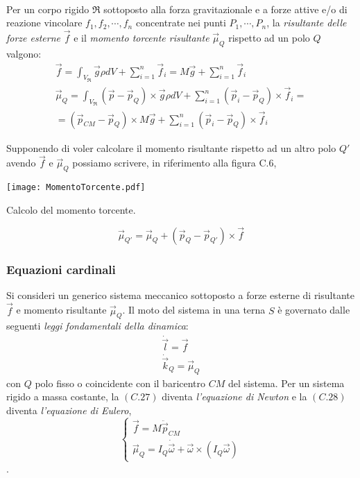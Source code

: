 \paragraph{}
Per un corpo rigido $\mathfrak{R}$ sottoposto alla forza gravitazionale e a forze attive e/o di reazione vincolare $f_1, f_2, \cdots, f_n$ concentrate nei punti $P_1, \cdots, P_n$, la \emph{risultante delle forze esterne} $\vec{f}$ e il \emph{momento torcente risultante} $\vec{\mu}_Q$ rispetto ad un polo $Q$ valgono:
\begin{eqnarray}
	\vec{f} = \int_{V_{\mathfrak{R}}} \vec{g} \rho dV + \sum_{i = 1}^{n} \vec{f}_i = M\vec{g} + \sum_{i = 1}^{n} \vec{f}_i \\
	\vec{\mu}_Q = \int_{V_{\mathfrak{R}}} (\vec{p} - \vec{p}_Q) \times \vec{g} \rho dV + \sum_{i = 1}^{n} (\vec{p}_i-\vec{p}_Q) \times \vec{f}_i = \\
	= (\vec{p}_{CM} - \vec{p}_Q) \times M\vec{g} + \sum_{i = 1}^{n} (\vec{p}_i-\vec{p}_Q) \times \vec{f}_i 
\end{eqnarray}

Supponendo di voler calcolare il momento risultante rispetto ad un altro polo $Q'$ avendo $\vec{f}$ e $\vec{\mu}_Q$ possiamo scrivere, in riferimento alla figura C.6,
\begin{center}
	\texttt{[image: MomentoTorcente.pdf]}
	\caption{Calcolo del momento torcente.}
\end{center}
\begin{equation}
	\vec{\mu}_{Q'} = \vec{\mu}_Q + (\vec{p}_Q - \vec{p}_{Q'}) \times \vec{f}
\end{equation}

\subsubsection{Equazioni cardinali}
Si consideri un generico sistema meccanico sottoposto a forze esterne di risultante $\vec{f}$ e momento risultante $\vec{\mu}_Q$. Il moto del sistema in una terna $S$ è governato dalle seguenti \emph{leggi fondamentali della dinamica}:
\begin{align}
	\dot{\vec{l}} = \vec{f} \\
	\dot{\vec{k}}_Q = \vec{\mu}_{Q}
\end{align} 
con $Q$ polo fisso o coincidente con il baricentro $CM$ del sistema. Per un sistema rigido a massa costante, la $(C.27)$ diventa \emph{l'equazione di Newton} e la $(C.28)$ diventa \emph{l'equazione di Eulero},
\begin{equation}
	\begin{cases}
		\vec{f} = M \ddot{\vec{p}}_{CM} \\
		\vec{\mu}_{Q} = I_Q \dot{\vec{\omega}} + \vec{\omega} \times (I_Q \vec{\omega}) 
	\end{cases}
\end{equation}.


